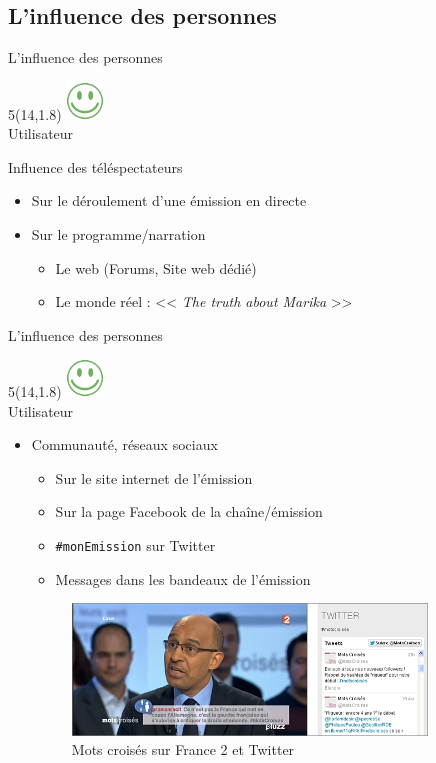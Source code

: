 \documentclass{beamer}
\newcommand{\happyUser}{%
			\begin{textblock}{5}(14,1.8)
				\includegraphics[width=1.0cm]{user_happy.png}\\
				\tiny Utilisateur
			\end{textblock}
}
\begin{document}
	\subsection{L'influence des personnes}
	\begin{frame}{L'influence des personnes}
		\happyUser{}
		\begin{block}{Influence des téléspectateurs}
			\vspace{10px}
			\begin{itemize}
			\item Sur le déroulement d'une émission en directe
			\vspace{10px}
			\item Sur le programme/narration
				\begin{itemize}
					\item Le web (Forums, Site web dédié)
					\item Le monde réel : << \textit{The truth about Marika} >>
				\end{itemize}
			\end{itemize}
			\vspace{10px}
		\end{block}
	\end{frame}
	\begin{frame}{L'influence des personnes}
		\happyUser{}
		\begin{itemize}
	\item Communauté, réseaux sociaux
		\begin{itemize}
			\item Sur le site internet de l'émission
			\item Sur la page Facebook de la chaîne/émission
			\item \texttt{\#monEmission} sur Twitter
			\item Messages dans les bandeaux de l'émission
		\end{itemize}
		\begin{figure}[H]
			\hspace{-25px}
			\includegraphics[height=3.5cm]{images/motscroises.jpg}
			\caption{Mots croisés sur France 2 et Twitter}
		\end{figure}
\end{itemize}
	\end{frame}
\end{document}
